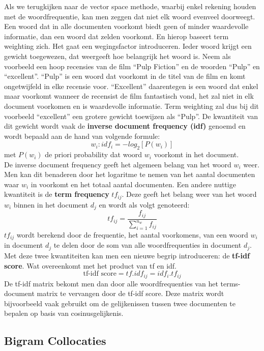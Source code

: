 Als we terugkijken naar de vector space methode, waarbij enkel rekening houden met de woordfrequentie, kan men zeggen dat niet elk woord evenveel doorweegt. Een woord dat in alle documenten voorkomt biedt geen of minder waardevolle informatie, dan een woord dat zelden voorkomt. En hierop baseert term weighting zich. Het gaat een wegingsfactor introduceren. Ieder woord krijgt een gewicht toegewezen, dat weergeeft hoe belangrijk het woord is. Neem als voorbeeld een hoop recensies van de film ``Pulp Fiction'' en de woorden ``Pulp'' en ``excellent''. ``Pulp'' is een woord dat voorkomt in de titel van de film en komt ongetwijfeld in elke recensie voor. ``Excellent'' daarentegen is een woord dat enkel maar voorkomt wanneer de recensist de film fantastisch vond, het zal niet in elk document voorkomen en is waardevolle informatie. Term weighting zal dus bij dit voorbeeld ``excellent'' een grotere gewicht toewijzen als ``Pulp''. 
%
De kwantiteit van dit gewicht wordt vaak de \textbf{inverse document frequency  (idf)} genoemd en wordt bepaald aan de hand van volgende formule:
\[w_{i}: idf_{i} = -log_{2}[P(w_{i})] \]
met $P(w_{i})$ de priori probability dat woord $w_{i}$ voorkomt in het document.\\
%
De inverse document frequency geeft het algemeen belang van het woord $w_{i}$ weer. Men kan dit benaderen door het logaritme te nemen van het aantal documenten waar $w_{i}$ in voorkomt en het totaal aantal documenten.
Een andere nuttige kwantiteit is de  \textbf{term frequency} $tf_{ij}$. Deze geeft het belang weer van het woord $w_{i}$ binnen in het document $d_{j}$  en wordt als volgt genoteerd:
\[ tf_{ij} = \frac{f_{ij}}{ \sum_{i=1}^{n_{w}}f_{ij}} \]
%
$tf_{ij}$ wordt berekend door de frequentie, het aantal voorkomens, van een woord $w_{i}$ in document $d_{j}$ te delen door de som van alle woordfrequenties in document $d_{j}$.
Met deze twee kwantiteiten kan men een nieuwe begrip introduceren: de \textbf{tf-idf score}. Wat overeenkomt met het product van tf en idf.
\[ \text{tf-idf score} = tf . idf_{ij} = idf_{i} . tf_{ij} \]
%
De tf-idf matrix bekomt men dan door alle woordfrequenties van het terms-document matrix te vervangen door de tf-idf score.
Deze matrix wordt bijvoorbeeld vaak gebruikt om de gelijkenissen tussen twee documenten te bepalen op basis van cosinusgelijkenis.


\subsection{Bigram Collocaties}\label{Bigram Collocaties}


